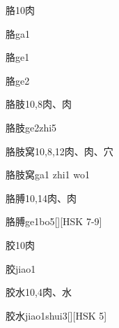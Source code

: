 \begin{Entry}{胳}{10}{⾁}
  \begin{Phonetics}{胳}{ga1}
  \end{Phonetics}
  \begin{Phonetics}{胳}{ge1}
  \end{Phonetics}
  \begin{Phonetics}{胳}{ge2}
  \end{Phonetics}
\end{Entry}

\begin{Entry}{胳肢}{10,8}{⾁、⾁}
  \begin{Phonetics}{胳肢}{ge2zhi5}
  \end{Phonetics}
\end{Entry}

\begin{Entry}{胳肢窝}{10,8,12}{⾁、⾁、⽳}
  \begin{Phonetics}{胳肢窝}{ga1 zhi1 wo1}
  \end{Phonetics}
\end{Entry}

\begin{Entry}{胳膊}{10,14}{⾁、⾁}
  \begin{Phonetics}{胳膊}{ge1bo5}[][HSK 7-9]
  \end{Phonetics}
\end{Entry}

\begin{Entry}{胶}{10}{⾁}
  \begin{Phonetics}{胶}{jiao1}
  \end{Phonetics}
\end{Entry}

\begin{Entry}{胶水}{10,4}{⾁、⽔}
  \begin{Phonetics}{胶水}{jiao1shui3}[][HSK 5]
  \end{Phonetics}
\end{Entry}

